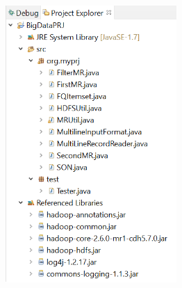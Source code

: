 \documentclass[]{report}
\begin{document}
	\begin{figure}
		\vspace{-0.3cm} 
		\hspace{1mm}
		\includegraphics[width=6.5cm, height=12cm]{./img/pe}
	\end{figure}
\end{document}
